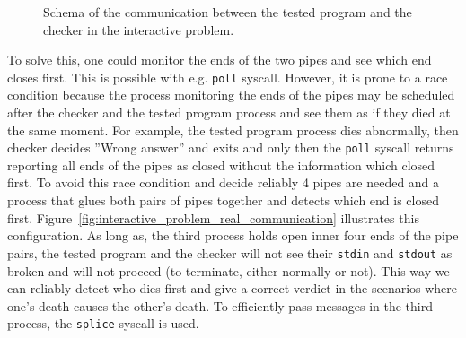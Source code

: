 \documentclass[en]{pracamgr}
\begin{document}
\begin{figure}[h]
\tikzset{>=latex} %
\centering
{}
\caption{Schema of the communication between the tested program and the checker in the interactive problem.}
\label{fig:intaractive_problem_communication_schema}
\end{figure}

To solve this, one could monitor the ends of the two pipes and see which end closes first. This is possible with e.g. \texttt{poll} syscall. However, it is prone to a race condition because the process monitoring the ends of the pipes may be scheduled after the checker and the tested program process and see them as if they died at the same moment. For example, the tested program process dies abnormally, then checker decides ''Wrong answer'' and exits and only then the \texttt{poll} syscall returns reporting all ends of the pipes as closed without the information which closed first. To avoid this race condition and decide reliably 4 pipes are needed and a process that glues both pairs of pipes together and detects which end is closed first. Figure~\ref{fig:interactive_problem_real_communication} illustrates this configuration. As long as, the third process holds open inner four ends of the pipe pairs, the tested program and the checker will not see their \texttt{stdin} and \texttt{stdout} as broken and will not proceed (to terminate, either normally or not). This way we can reliably detect who dies first and give a correct verdict in the scenarios where one's death causes the other's death. To efficiently pass messages in the third process, the \texttt{splice} syscall is used.
\end{document}
